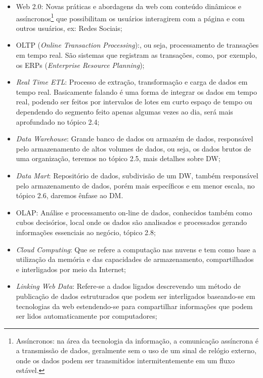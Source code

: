 \begin{itemize}
    \item Web 2.0: Novas pr\'{a}ticas e abordagens da web com conteúdo dinâmicos e ass\'{i}ncronos\footnote{Ass\'{i}ncronos: na \'{a}rea da tecnologia da informa\c{c}\~{a}o, a comunica\c{c}\~{a}o ass\'{i}ncrona \'{e} a transmiss\~{a}o de dados, geralmente sem o uso de um sinal de rel\'{o}gio externo, onde os dados podem ser transmitidos intermitentemente em um fluxo est\'{a}vel.} que possibilitam os usu\'{a}rios interagirem com a p\'{a}gina e com outros usu\'{a}rios, ex: Redes Sociais;
    \item OLTP (\textit{Online Transaction Processing}):, ou seja, processamento de transa\c{c}\~{o}es em tempo real. S\~{a}o sistemas que registram as transa\c{c}\~{o}es, como, por exemplo, os ERPs (\textit{Enterprise Resource Planning});
    \item \textit{Real Time ETL}: Processo de extra\c{c}\~{a}o, transforma\c{c}\~{a}o e carga de dados em tempo real. Basicamente falando \'{e} uma forma de integrar os dados em tempo real, podendo ser feitos por intervalos de lotes em curto espa\c{c}o de tempo ou dependendo do segmento feito apenas algumas vezes ao dia, ser\'{a} mais aprofundado no t\'{o}pico 2.4;
    \item \textit{Data Warehouse}: Grande banco de dados ou armaz\'{e}m de dados, respons\'{a}vel pelo armazenamento de altos volumes de dados, ou seja, os dados brutos de uma organiza\c{c}\~{a}o, teremos no t\'{o}pico 2.5, mais detalhes sobre DW; 
    \item \textit{Data Mart}: Reposit\'{o}rio de dados, subdivis\~{a}o de um DW, tamb\'{e}m respons\'{a}vel pelo armazenamento de dados, por\'{e}m mais espec\'{i}ficos e em menor escala, no t\'{o}pico 2.6, daremos \^{e}nfase ao DM.
    \item OLAP: An\'{a}lise e processamento on-line de dados, conhecidos tamb\'{e}m como cubos decis\'{o}rios, local onde os dados s\~{a}o analisados e processados gerando informa\c{c}\~{o}es essenciais ao neg\'{o}cio, t\'{o}pico 2.8; 
    \item \textit{Cloud Computing}: Que se refere a computa\c{c}\~{a}o nas nuvens e tem como base a utiliza\c{c}\~{a}o da mem\'{o}ria e das capacidades de armazenamento, compartilhados e interligados por meio da Internet;
    \item \textit{Linking Web Data}: Refere-se a dados ligados descrevendo um m\'{e}todo de publica\c{c}\~{a}o de dados estruturados que podem ser interligados baseando-se em tecnologias da web estendendo-se para compartilhar informa\c{c}\~{o}es que podem ser lidos automaticamente por computadores; 

\end{itemize}
